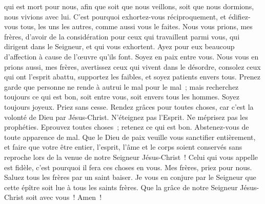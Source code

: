 \begin{multicols}{2}
qui est mort pour nous, afin que soit que nous veillons, soit que nous dormions, nous vivions avec lui.
C'est pourquoi exhortez-vous réciproquement, et édifiez-vous tous, les uns les autres, comme aussi vous le faites.
Nous vous prions, mes frères, d'avoir de la considération pour ceux qui travaillent parmi vous, qui dirigent dans le Seigneur, et qui vous exhortent.
Ayez pour eux beaucoup d'affection à cause de l'œuvre qu'ils font. Soyez en paix entre vous.
Nous vous en prions aussi, mes frères, avertissez ceux qui vivent dans le désordre, consolez ceux qui ont l'esprit abattu, supportez les faibles, et soyez patients envers tous.
Prenez garde que personne ne rende à autrui le mal pour le mal~; mais recherchez toujours ce qui est bon, soit entre vous, soit envers tous les hommes.
Soyez toujours joyeux.
Priez sans cesse.
Rendez grâces pour toutes choses, car c'est la volonté de Dieu par Jésus-Christ.
N'éteignez pas l'Esprit.
Ne méprisez pas les prophéties.
Eprouvez toutes choses~; retenez ce qui est bon.
Abstenez-vous de toute apparence de mal.
Que le Dieu de paix veuille vous sanctifier entièrement, et faire que votre être entier, l'esprit, l'âme et le corps soient conservés sans reproche lors de la venue de notre Seigneur Jésus-Christ~!
Celui qui vous appelle est fidèle, c'est pourquoi il fera ces choses en vous.
Mes frères, priez pour nous.
Saluez tous les frères par un saint baiser.
Je vous en conjure par le Seigneur que cette épître soit lue à tous les saints frères.
Que la grâce de notre Seigneur Jésus-Christ soit avec vous~! Amen~!
\PPE{}
\end{multicols}
